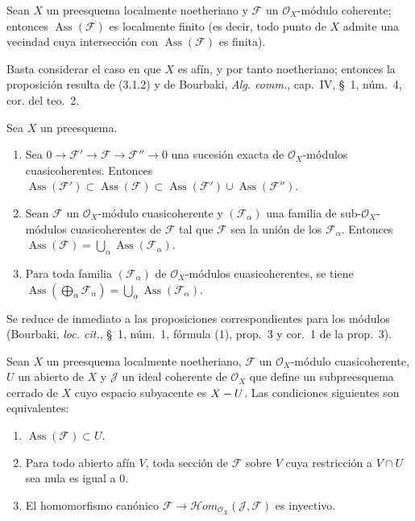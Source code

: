 \begin{proposition}[3.1.6]
\label{IV.2.3.1.6-fr}
Sean $X$ un preesquema localmente noetheriano y $\mathcal F$ un
$\mathcal O_X$-módulo coherente; entonces $\operatorname{Ass}(\mathcal F)$ es
localmente finito \textup{(es decir, todo punto de $X$ admite una vecindad cuya
intersección con $\operatorname{Ass}(\mathcal F)$ es finita)}.
\end{proposition}

Basta considerar el caso en que $X$ es afín, y por tanto noetheriano; entonces
la proposición resulta de (3.1.2) y de Bourbaki, \emph{Alg. comm.}, cap.~IV,
\S~1, núm.~4, cor. del teo.~2.

\begin{proposition}[3.1.7]
Sea $X$ un preesquema.
\begin{enumerate}
\item[\emph{(i)}] Sea $0\to\mathcal F'\to\mathcal F\to\mathcal F''\to0$
una sucesión exacta de $\mathcal O_X$-módulos cuasicoherentes. Entonces
$\operatorname{Ass}(\mathcal F')\subset\operatorname{Ass}(\mathcal F)
\subset\operatorname{Ass}(\mathcal F')\cup\operatorname{Ass}(\mathcal F'')$.
\item[\emph{(ii)}] Sean $\mathcal F$ un $\mathcal O_X$-módulo
cuasicoherente y $(\mathcal F_\alpha)$ una familia de
sub-$\mathcal O_X$-módulos cuasicoherentes de $\mathcal F$ tal que
$\mathcal F$ sea la unión de los $\mathcal F_\alpha$. Entonces
$\operatorname{Ass}(\mathcal F)=\bigcup_\alpha\operatorname{Ass}(\mathcal F_\alpha)$.
\item[\emph{(iii)}] Para toda familia $(\mathcal F_\alpha)$ de
$\mathcal O_X$-módulos cuasicoherentes, se tiene
$\operatorname{Ass}(\bigoplus_\alpha\mathcal F_\alpha)
=\bigcup_\alpha\operatorname{Ass}(\mathcal F_\alpha)$.
\end{enumerate}
\end{proposition}

Se reduce de inmediato a las proposiciones correspondientes para los módulos
(Bourbaki, \emph{loc. cit.}, \S~1, núm.~1, fórmula (1), prop.~3 y cor.~1 de la
prop.~3).

\begin{proposition}[3.1.8]
\label{IV.2.3.1.8-fr}
Sean $X$ un preesquema localmente noetheriano, $\mathcal F$ un
$\mathcal O_X$-módulo cuasicoherente, $U$ un abierto de $X$ y $\mathcal J$ un
ideal coherente de $\mathcal O_X$ que define un subpreesquema cerrado de $X$
cuyo espacio subyacente es $X- U$. Las condiciones siguientes son equivalentes:
\begin{enumerate}
\item[\emph{a)}] $\operatorname{Ass}(\mathcal F)\subset U$.
\item[\emph{b)}] Para todo abierto afín $V$, toda sección de $\mathcal F$
sobre $V$ cuya restricción a $V\cap U$ sea nula es igual a $0$.
\item[\emph{c)}] El homomorfismo canónico
$\mathcal F\to\mathcal Hom_{\mathcal O_X}(\mathcal J,\mathcal F)$ es
inyectivo.
\end{enumerate}
\end{proposition}


